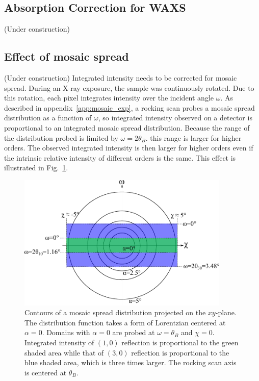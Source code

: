 \subsection{Absorption Correction for WAXS}\label{sec:abs_correction_WAXS}
(Under construction)

\subsection{Effect of mosaic spread}\label{sec:mosaic_spread_correction}
(Under construction)
Integrated intensity needs to be corrected for mosaic spread. 
During an X-ray exposure, the sample
was continuously rotated. Due to this rotation, each pixel integrates 
intensity over the incident angle $\omega$.
As described in
appendix~\ref{app:mosaic_exp}, a rocking scan probes a mosaic spread distribution
as a function of $\omega$, so integrated intensity observed on a detector 
is proportional to an integrated mosaic spread distribution.
Because the range of the distribution probed is limited by 
$\omega=2\theta_B$. this range is larger for higher orders. The observed 
integrated intensity is then larger for higher orders even if the intrinsic
relative intensity of different orders is the same. This effect is 
illustrated in Fig.~\ref{fig:mosaic_contour}.

\begin{figure}[htbp]
  \centering
  \includegraphics[width=0.9\textwidth]{figures/ripple/analysis/mosaic_contour}
  \caption{Contours of a mosaic spread distribution projected on the $xy$-plane.
  The distribution function takes a form of Lorentzian centered at $\alpha=0$.
  Domains with $\alpha=0$ are probed at $\omega=\theta_B$ and $\chi=0$.
  Integrated intensity of $(1,0)$ reflection is proportional to the green
  shaded area while that of $(3,0)$ reflection is proportional to the
  blue shaded area, which is three times larger. The rocking scan axis
  is centered at $\theta_B$.}
  \label{fig:mosaic_contour} 
\end{figure}

